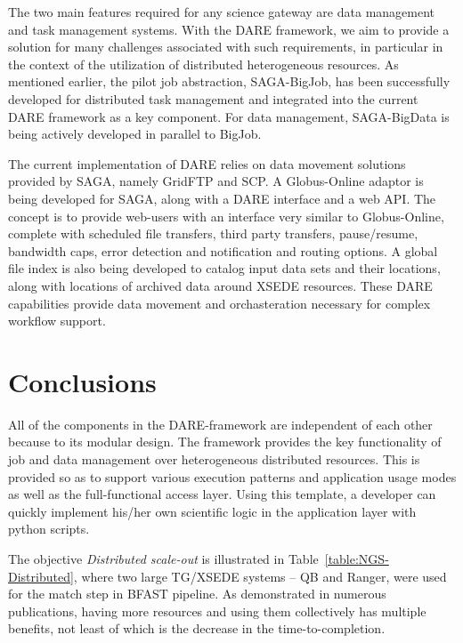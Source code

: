 \documentclass[]{svjour3}
\begin{document}
The two main features required for any science gateway are data
management and task management systems.  With the DARE framework, we
aim to provide a solution for many challenges associated with such
requirements, in particular in the context of the utilization of
distributed heterogeneous resources.  As mentioned earlier, the pilot
job abstraction, SAGA-BigJob, has been successfully developed for
distributed task management and integrated into the current DARE
framework as a key component.  For data management, SAGA-BigData is
being actively developed in parallel to BigJob.

The current implementation of DARE relies on data movement solutions
provided by SAGA, namely GridFTP and SCP. A Globus-Online adaptor is
being developed for SAGA, along with a DARE interface and a web
API. The concept is to provide web-users with an interface very
similar to Globus-Online, complete with scheduled file transfers,
third party transfers, pause/resume, bandwidth caps, error detection
and notification and routing options. A global file index is also
being developed to catalog input data sets and their locations, along
with locations of archived data around XSEDE resources. These DARE
capabilities provide data movement and orchasteration necessary for
complex workflow support.

\section{Conclusions}

All of the components in the DARE-framework are independent of each
other because to its modular design. The framework provides the key
functionality of job and data management over heterogeneous
distributed resources. This is provided so as to support various
execution patterns and application usage modes as well as the
full-functional access layer. Using this template, a developer can
quickly implement his/her own scientific logic in the application
layer with python scripts.

The objective {\it Distributed scale-out} is illustrated in
Table~\ref{table:NGS-Distributed}, where two large TG/XSEDE systems -- QB
and Ranger, were used for the match step in BFAST pipeline. As
demonstrated in numerous publications, having more resources and using
them collectively has multiple benefits, not least of which is the
decrease in the time-to-completion.

\end{document}
